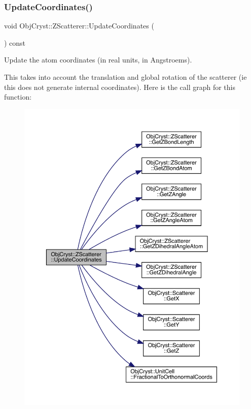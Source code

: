 \subsubsection{\texorpdfstring{UpdateCoordinates()}{UpdateCoordinates()}}
{\footnotesize\ttfamily void Obj\+Cryst\+::\+Z\+Scatterer\+::\+Update\+Coordinates (\begin{DoxyParamCaption}{ }\end{DoxyParamCaption}) const\hspace{0.3cm}{\ttfamily [protected]}}

Update the atom coordinates (in real units, in Angstroems).

This takes into account the translation and global rotation of the scatterer (ie this does not generate \textquotesingle{}internal coordinates). Here is the call graph for this function\+:
\nopagebreak
\begin{figure}[H]
\begin{center}
\leavevmode
\includegraphics[width=350pt]{class_obj_cryst_1_1_z_scatterer_ab6afaab6104211bbca7722033e17a128_cgraph}
\end{center}
\end{figure}
